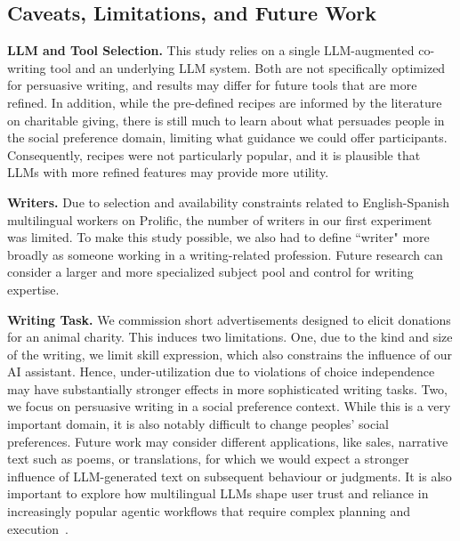 \subsection{Caveats, Limitations, and Future Work}
\textbf{LLM and Tool Selection.} This study relies on a single LLM-augmented co-writing tool and an underlying LLM system. Both are not specifically optimized for persuasive writing, and results may differ for future tools that are more refined. In addition, while the pre-defined recipes are informed by the literature on charitable giving, there is still much to learn about what persuades people in the social preference domain, limiting what guidance we could offer participants. Consequently, recipes were not particularly popular, and it is plausible that LLMs with more refined features may provide more utility.

\noindent
\textbf{Writers.} Due to selection and availability constraints related to English-Spanish multilingual workers on Prolific, the number of writers in our first experiment was limited.
To make this study possible, we also had to define ``writer" more broadly as someone working in a writing-related profession. Future research can consider a larger and more specialized subject pool and control for writing expertise. 

\noindent
\textbf{Writing Task.} We commission short advertisements designed to elicit donations for an animal charity. This induces two limitations. One, due to the kind and size of the writing, we limit skill expression, which also constrains the influence of our AI assistant. Hence, under-utilization due to violations of choice independence may have substantially stronger effects in more sophisticated writing tasks. Two, we focus on persuasive writing in a social preference context. While this is a very important domain, it is also notably difficult to change peoples' social preferences. Future work may consider different applications, like sales, narrative text such as poems, or translations, for which we would expect a stronger influence of LLM-generated text on subsequent behaviour or judgments. It is also important to explore how multilingual LLMs shape user trust and reliance in increasingly popular agentic workflows that require complex planning and execution~\cite{he2025plan}.

